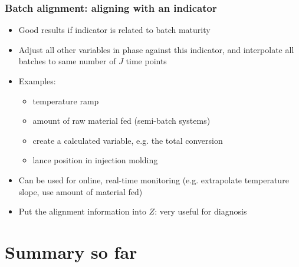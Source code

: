 \begin{frame}\frametitle{Batch alignment: aligning with an indicator}

\begin{itemize}
	
	\item	Good results if indicator is related to batch maturity
	
	\item	Adjust all other variables in phase against this indicator, and interpolate all batches to same number of \( J \) time points
	
	\item	Examples: 
			
			\begin{itemize}
				\item	temperature ramp
				
				\item	amount of raw material fed (semi-batch systems)
				
				\item	create a calculated variable, e.g. the total conversion
				
				\item	lance position in injection molding
			\end{itemize}
			
			\pause
	
	\item	Can be used for online, real-time monitoring (e.g. extrapolate temperature slope, use amount of material fed) \pause
	
	\item	Put the alignment information into \( Z \): very useful for diagnosis
\end{itemize}


\end{frame}

\section{Summary so far}

